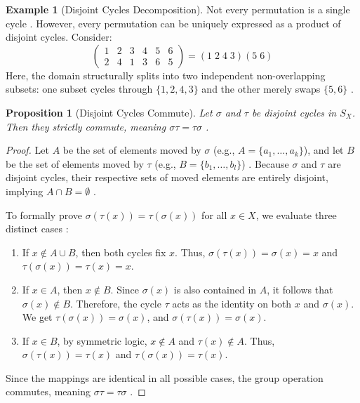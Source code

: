 \documentclass[11pt]{article}
\theoremstyle{definition}
\newtheorem{example}{Example}[section]
\theoremstyle{plain}
\newtheorem{proposition}{Proposition}[theorem]
\theoremstyle{remark}
\begin{document}
\begin{example}[Disjoint Cycles Decomposition]
Not every permutation is a single cycle \cite{fraleigh}. However, every permutation can be uniquely expressed as a product of disjoint cycles. Consider:
\begin{equation}
    \begin{pmatrix} 1 & 2 & 3 & 4 & 5 & 6 \\ 2 & 4 & 1 & 3 & 6 & 5 \end{pmatrix} = (1 \; 2 \; 4 \; 3)(5 \; 6)
\end{equation}
Here, the domain structurally splits into two independent non-overlapping subsets: one subset cycles through $\{1, 2, 4, 3\}$ and the other merely swaps $\{5, 6\}$ \cite{gallian}.
\end{example}

\begin{proposition}[Disjoint Cycles Commute]
Let $\sigma$ and $\tau$ be disjoint cycles in $S_X$. Then they strictly commute, meaning $\sigma \tau = \tau \sigma$ \cite{fraleigh}.
\end{proposition}

\begin{proof}
Let $A$ be the set of elements moved by $\sigma$ (e.g., $A = \{a_1, \dots, a_k\}$), and let $B$ be the set of elements moved by $\tau$ (e.g., $B = \{b_1, \dots, b_l\}$) \cite{dummit}. Because $\sigma$ and $\tau$ are disjoint cycles, their respective sets of moved elements are entirely disjoint, implying $A \cap B = \emptyset$ \cite{gallian}.

To formally prove $\sigma(\tau(x)) = \tau(\sigma(x))$ for all $x \in X$, we evaluate three distinct cases \cite{dummit}:
\begin{enumerate}
    \item If $x \notin A \cup B$, then both cycles fix $x$. Thus, $\sigma(\tau(x)) = \sigma(x) = x$ and $\tau(\sigma(x)) = \tau(x) = x$.
    \item If $x \in A$, then $x \notin B$. Since $\sigma(x)$ is also contained in $A$, it follows that $\sigma(x) \notin B$. Therefore, the cycle $\tau$ acts as the identity on both $x$ and $\sigma(x)$. We get $\tau(\sigma(x)) = \sigma(x)$, and $\sigma(\tau(x)) = \sigma(x)$.
    \item If $x \in B$, by symmetric logic, $x \notin A$ and $\tau(x) \notin A$. Thus, $\sigma(\tau(x)) = \tau(x)$ and $\tau(\sigma(x)) = \tau(x)$.
\end{enumerate}
Since the mappings are identical in all possible cases, the group operation commutes, meaning $\sigma \tau = \tau \sigma$ \cite{fraleigh}.
\end{proof}
\end{document}
